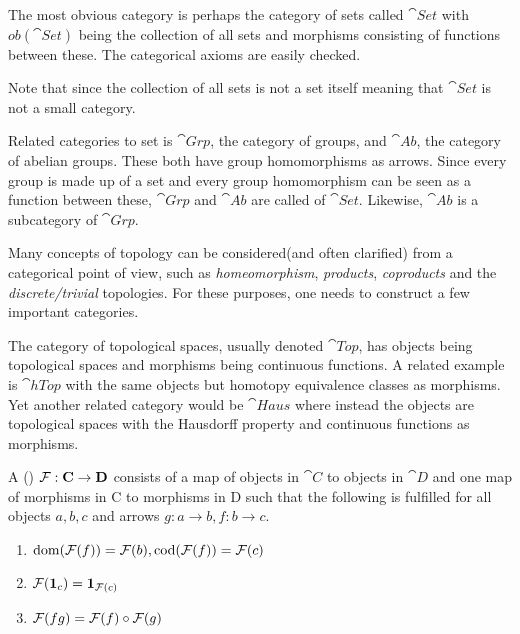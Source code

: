 \documentclass[../../main.tex]{subfiles}
\begin{document}
    \begin{example}
        The most obvious category is perhaps the category of sets called $\cat{Set}$ with $ob(\cat{Set})$ being the collection of all sets and morphisms consisting of functions between these. The categorical axioms are easily checked.
        
        Note that since the collection of all sets is not a set itself meaning that $\cat{Set}$ is not a small category.

        Related categories to set is $\cat{Grp}$, the category of groups, and $\cat{Ab}$, the category of abelian groups. These both have group homomorphisms as arrows. Since every group is made up of a set and every group homomorphism can be seen as a function between these, $\cat{Grp}$ and $\cat{Ab}$ are called  of $\cat{Set}$. Likewise, $\cat{Ab}$ is a subcategory of $\cat{Grp}$.
    \end{example}

    \begin{example}
        Many concepts of topology can be considered(and often clarified) from a categorical point of view, such as \emph{homeomorphism}, \emph{products}, \emph{coproducts} and the \emph{discrete/trivial} topologies. For these purposes, one needs to construct a few important categories.
        
        The category of topological spaces, usually denoted $\cat{Top}$, has objects being topological spaces and morphisms being continuous functions. A related example is $\cat{hTop}$ with the same objects but homotopy equivalence classes as morphisms. Yet another related category would be $\cat{Haus}$ where instead the objects are topological spaces with the Hausdorff property and continuous functions as morphisms.
    \end{example}

    \begin{definition}
        A ()  $\functor{F}: \cat{C} \to \cat{D}$ consists of a map of objects in $\cat{C}$ to objects in $\cat{D}$ and one map of morphisms in C to morphisms in D such that the following is fulfilled for all objects $a, b, c$ and arrows $g: a \to b, f: b \to c$.
        
        \begin{enumerate}
            \item $\domain{\functor{F}(f)} = \functor{F}(b), \codomain{\functor{F}(f)} = \functor{F}(c)$ \label{covar1}
            \item $\functor{F}(\idarrow[c]) = \idarrow[\functor{F}(c)]$
            \item $\functor{F}(fg) = \functor{F}(f) \circ \functor{F}(g)$ \label{covar2}
        \end{enumerate}
    \end{definition}
\end{document}
